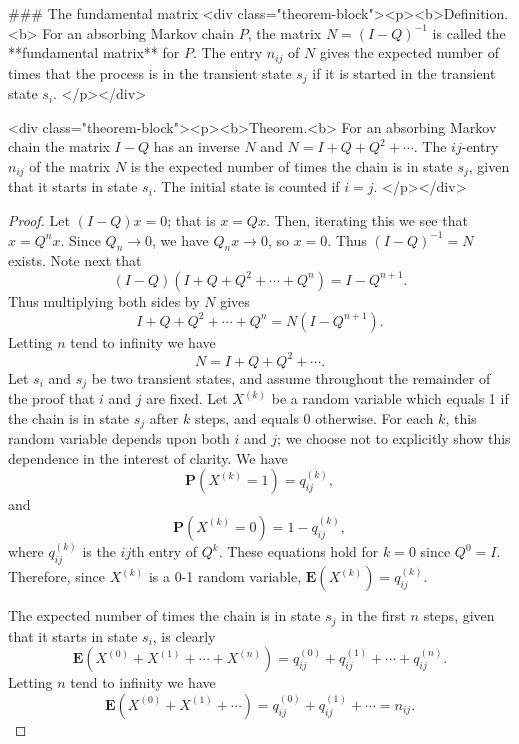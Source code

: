 ### The fundamental matrix
<div class="theorem-block"><p><b>Definition.<b> 
For an absorbing Markov chain $P$, the matrix $N = (I-Q)^{-1}$ is called the **fundamental matrix** for $P$. The entry $n_{ij}$ of $N$ gives the expected number of times that the process is in the transient state $s_j$ if it is started in the transient state $s_i$.
</p></div>

<div class="theorem-block"><p><b>Theorem.<b> 
For an absorbing Markov chain the matrix $I-Q$ has an inverse $N$ and $N = I + Q + Q^2 + \cdots$. The $ij$-entry $n_{ij}$ of the matrix $N$ is the expected number of times the chain is in state $s_j$, given that it starts in state $s_i$. The initial state is counted if $i = j$.
</p></div>

\begin{proof}
Let $(I-Q)x = 0$; that is $x = Qx$. Then, iterating this we see that $x = Q^n x$. Since $Q_n \to 0$, we have $Q_n x \to 0$, so $x = 0$. Thus $(I-Q)^{-1} = N$
exists. Note next that
$$\begin{equation}
    (I-Q)(I+Q + Q^2 + \cdots + Q^n) = I - Q^{n+1}.
\end{equation}$$
Thus multiplying both sides by $N$ gives
$$\begin{equation}
    I + Q + Q^2 + \cdots + Q^n = N(I-Q^{n+1}) .
\end{equation}$$
Letting $n$ tend to infinity we have
$$\begin{equation}
    N = I + Q + Q^2 + \cdots .
\end{equation}$$
Let $s_i$ and $s_j$ be two transient states, and assume throughout the remainder of the proof that $i$ and $j$ are fixed. Let $X^{(k)}$ be a random variable which equals 1 if the chain is in state $s_j$ after $k$ steps, and equals 0 otherwise. For each $k$, this random variable depends upon both $i$ and $j$; we choose not to explicitly show this dependence in the interest of clarity. We have
$$\begin{equation}
    \mathbf{P} \left(X^{(k)}=1\right)=q_{i j}^{(k)},
\end{equation}$$
and 
$$\begin{equation}
    \mathbf{P} \left(X^{(k)}=0\right)=1-q_{i j}^{(k)},
\end{equation}$$
where $q_{i j}^{(k)}$ is the $ij$th entry of $Q^k$. These equations hold for $k = 0$ since $Q^0 = I$. Therefore, since $X^{(k)}$ is a 0-1 random variable, $\mathbf{E}(X^{(k)}) = q_{i j}^{(k)}$.

The expected number of times the chain is in state $s_j$ in the first $n$ steps, given that it starts in state $s_i$, is clearly
$$\begin{equation}
    \mathbf{E}\left(X^{(0)}+X^{(1)}+\cdots+X^{(n)}\right)=q_{i j}^{(0)}+q_{i j}^{(1)}+\cdots+q_{i j}^{(n)}.
\end{equation}$$
Letting $n$ tend to infinity we have
$$\begin{equation}
    \mathbf{E}\left(X^{(0)}+X^{(1)}+\cdots\right)=q_{i j}^{(0)}+q_{i j}^{(1)}+\cdots=n_{i j}.
\end{equation}$$
\end{proof}


